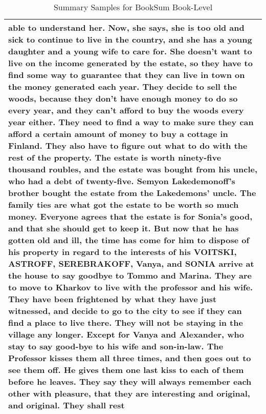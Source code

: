 \documentclass{article} \usepackage{iclr2022_conference,times}
\begin{document}
\begin{table}[!htbp]
\begin{tabular}{p{\linewidth}}
able to understand her. Now, she says, she is too old and sick to continue to live in the country, and she has a young daughter and a young wife to care for. She doesn't want to live on the income generated by the estate, so they have to find some way to guarantee that they can live in town on the money generated each year. They decide to sell the woods, because they don't have enough money to do so every year, and they can't afford to buy the woods every year either. They need to find a way to make sure they can afford a certain amount of money to buy a cottage in Finland. They also have to figure out what to do with the rest of the property. The estate is worth ninety-five thousand roubles, and the estate was bought from his uncle, who had a debt of twenty-five. Semyon Lakedemonoff's brother bought the estate from the Lakedemons' uncle. The family ties are what got the estate to be worth so much money. Everyone agrees that the estate is for Sonia's good, and that she should get to keep it. But now that he has gotten old and ill, the time has come for him to dispose of his property in regard to the interests of his VOITSKI, ASTROFF, SEREBRAKOFF, Vanya, and SONIA arrive at the house to say goodbye to Tommo and Marina. They are to move to Kharkov to live with the professor and his wife. They have been frightened by what they have just witnessed, and decide to go to the city to see if they can find a place to live there. They will not be staying in the village any longer. Except for Vanya and Alexander, who stay to say good-bye to his wife and son-in-law. The Professor kisses them all three times, and then goes out to see them off. He gives them one last kiss to each of them before he leaves. They say they will always remember each other with pleasure, that they are interesting and original, and original. They shall rest
    \\
    \bottomrule
    \end{tabular}
    \caption{
    Summary Samples for BookSum Book-Level
    }
\end{table}
\end{document}
